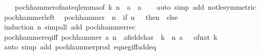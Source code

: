 \begin{isabellebody}
\ \ \ \ pochhammer{\isacharunderscore}{\kern0pt}of{\isacharunderscore}{\kern0pt}nat{\isacharunderscore}{\kern0pt}eq{\isacharunderscore}{\kern0pt}{}{\isacharunderscore}{\kern0pt}lemma{\isacharprime}{\kern0pt}{\isacharbrackleft}{\kern0pt}of\ k\ n{\isacharcomma}{\kern0pt}\ \ {\isacharquery}{\kern0pt}{\isacharprime}{\kern0pt}a\ {\isacharequal}{\kern0pt}\ {\isacharprime}{\kern0pt}a{\isacharbrackright}{\kern0pt}\isanewline
\ \ \isamarkupfalse%
\ {\isacharparenleft}{\kern0pt}auto\ simp\ add{\isacharcolon}{\kern0pt}\ not{\isacharunderscore}{\kern0pt}le{\isacharbrackleft}{\kern0pt}symmetric{\isacharbrackright}{\kern0pt}{\isacharparenright}{\kern0pt}%
\endisatagproof
{\isafoldproof}%
%
\isadelimproof
\isanewline
%
\endisadelimproof
\isanewline
{}\isamarkupfalse%
\ pochhammer{\isacharunderscore}{\kern0pt}{}{\isacharunderscore}{\kern0pt}left{\isacharcolon}{\kern0pt}\isanewline
\ \ {\isachardoublequoteopen}pochhammer\ {}\ n\ {\isacharequal}{\kern0pt}\ {\isacharparenleft}{\kern0pt}if\ n\ {\isacharequal}{\kern0pt}\ {}\ then\ {}\ else\ {}{\isacharparenright}{\kern0pt}{\isachardoublequoteclose}\isanewline
%
\isadelimproof
\ \ %
\endisadelimproof
%
\isatagproof
{}\isamarkupfalse%
\ {\isacharparenleft}{\kern0pt}induction\ n{\isacharparenright}{\kern0pt}\ {\isacharparenleft}{\kern0pt}simp{\isacharunderscore}{\kern0pt}all\ add{\isacharcolon}{\kern0pt}\ pochhammer{\isacharunderscore}{\kern0pt}rec{\isacharparenright}{\kern0pt}%
\endisatagproof
{\isafoldproof}%
%
\isadelimproof
\isanewline
%
\endisadelimproof
\isanewline
{}\isamarkupfalse%
\ pochhammer{\isacharunderscore}{\kern0pt}eq{\isacharunderscore}{\kern0pt}{}{\isacharunderscore}{\kern0pt}iff{\isacharcolon}{\kern0pt}\ {\isachardoublequoteopen}pochhammer\ a\ n\ {\isacharequal}{\kern0pt}\ {\isacharparenleft}{\kern0pt}{}{\isacharcolon}{\kern0pt}{\isacharcolon}{\kern0pt}{\isacharprime}{\kern0pt}a{\isacharcolon}{\kern0pt}{\isacharcolon}{\kern0pt}field{\isacharunderscore}{\kern0pt}char{\isacharunderscore}{\kern0pt}{}{\isacharparenright}{\kern0pt}\ {\isasymlongleftrightarrow}\ {\isacharparenleft}{\kern0pt}{\isasymexists}k\ {\isacharless}{\kern0pt}\ n{\isachardot}{\kern0pt}\ a\ {\isacharequal}{\kern0pt}\ {\isacharminus}{\kern0pt}\ of{\isacharunderscore}{\kern0pt}nat\ k{\isacharparenright}{\kern0pt}{\isachardoublequoteclose}\isanewline
%
\isadelimproof
\ \ %
\endisadelimproof
%
\isatagproof
{}\isamarkupfalse%
\ {\isacharparenleft}{\kern0pt}auto\ simp\ add{\isacharcolon}{\kern0pt}\ pochhammer{\isacharunderscore}{\kern0pt}prod\ eq{\isacharunderscore}{\kern0pt}neg{\isacharunderscore}{\kern0pt}iff{\isacharunderscore}{\kern0pt}add{\isacharunderscore}{\kern0pt}eq{\isacharunderscore}{\kern0pt}{}{\isacharparenright}{\kern0pt}%

\end{isabellebody}
